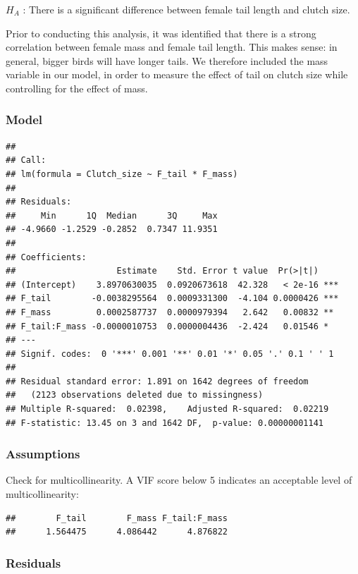 \documentclass[
  12pt,
]{article}
\begin{document}
\(H_A\) : There is a significant difference between female tail length
and clutch size.

Prior to conducting this analysis, it was identified that there is a
strong correlation between female mass and female tail length. This
makes sense: in general, bigger birds will have longer tails. We
therefore included the mass variable in our model, in order to measure
the effect of tail on clutch size while controlling for the effect of
mass.

\hypertarget{model}{%
\subsubsection{Model}\label{model}}

\begin{verbatim}
## 
## Call:
## lm(formula = Clutch_size ~ F_tail * F_mass)
## 
## Residuals:
##     Min      1Q  Median      3Q     Max 
## -4.9660 -1.2529 -0.2852  0.7347 11.9351 
## 
## Coefficients:
##                    Estimate    Std. Error t value  Pr(>|t|)    
## (Intercept)    3.8970630035  0.0920673618  42.328   < 2e-16 ***
## F_tail        -0.0038295564  0.0009331300  -4.104 0.0000426 ***
## F_mass         0.0002587737  0.0000979394   2.642   0.00832 ** 
## F_tail:F_mass -0.0000010753  0.0000004436  -2.424   0.01546 *  
## ---
## Signif. codes:  0 '***' 0.001 '**' 0.01 '*' 0.05 '.' 0.1 ' ' 1
## 
## Residual standard error: 1.891 on 1642 degrees of freedom
##   (2123 observations deleted due to missingness)
## Multiple R-squared:  0.02398,    Adjusted R-squared:  0.02219 
## F-statistic: 13.45 on 3 and 1642 DF,  p-value: 0.00000001141
\end{verbatim}

\hypertarget{assumptions}{%
\subsubsection{Assumptions}\label{assumptions}}

Check for multicollinearity. A VIF score below 5 indicates an acceptable
level of multicollinearity:

\begin{verbatim}
##        F_tail        F_mass F_tail:F_mass 
##      1.564475      4.086442      4.876822
\end{verbatim}

\hypertarget{residuals}{%
\subsubsection{Residuals}\label{residuals}}
\end{document}
